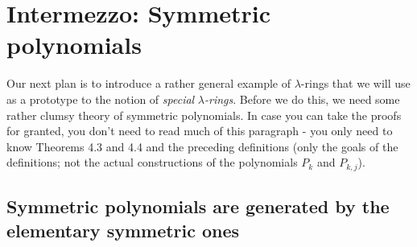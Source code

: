 \documentclass[numbers=enddot,12pt,final,onecolumn,notitlepage]{scrartcl}%
\begin{document}
\section{Intermezzo: Symmetric polynomials}

Our next plan is to introduce a rather general example of $\lambda$-rings that
we will use as a prototype to the notion of \textit{special }$\lambda
$\textit{-rings}. Before we do this, we need some rather clumsy theory of
symmetric polynomials. In case you can take the proofs for granted, you don't
need to read much of this paragraph - you only need to know Theorems 4.3 and
4.4 and the preceding definitions (only the goals of the definitions; not the
actual constructions of the polynomials $P_{k}$ and $P_{k,j}$).

\subsection{Symmetric polynomials are generated by the elementary symmetric
ones}
\end{document}

